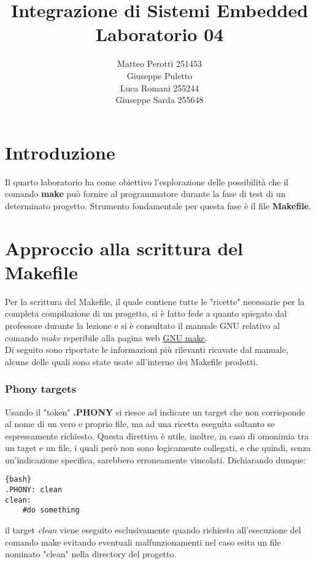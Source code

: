 \documentclass{article}
\title{Integrazione di Sistemi Embedded\\ Laboratorio 04}
\author{Matteo Perotti 251453\\ Giuseppe Puletto\\ Luca Romani 255244\\ Giuseppe Sarda 255648}
\begin{document}
\maketitle
\newpage
\section{Introduzione}
Il quarto laboratorio ha come obiettivo l'esplorazione delle possibilità che il comando \textbf{make} può fornire al programmatore durante la fase di test di un determinato progetto. Strumento fondamentale per questa fase è il file \textbf{Makefile}.
\section{Approccio alla scrittura del Makefile}
Per la scrittura del Makefile, il quale contiene tutte le "ricette" necessarie per la completa compilazione di un progetto, si è fatto fede a quanto spiegato dal professore durante la lezione e si è consultato il manuale GNU relativo al comando  \textit{make} reperibile alla pagina web \href{https://www.gnu.org/software/make/manual/make.html}{GNU make}.\\
Di seguito sono riportate le informazioni più rilevanti ricavate dal manuale, alcune delle quali sono state usate all'interno dei Makefile prodotti.
\subsubsection*{Phony targets}
Usando il "token" \textbf{.PHONY} si riesce ad indicare un target che non corrisponde al nome di un vero e proprio file, ma ad una ricetta eseguita soltanto se espressamente richiesto. Questa direttiva è utile, inoltre, in caso di omonimia tra un taget e un file, i quali però non sono logicamente collegati, e che quindi, senza un'indicazione specifica, sarebbero erroneamente vincolati.
Dichiarando dunque:
\begin{lstlisting}{bash}
.PHONY: clean
clean:
	#do something
\end{lstlisting}
il target \textit{clean} viene eseguito esclusivamente quando richiesto all'esecuzione del comando make evitando eventuali malfunzionamenti nel caso esita un file nominato "clean" nella directory del progetto.
\end{document}
